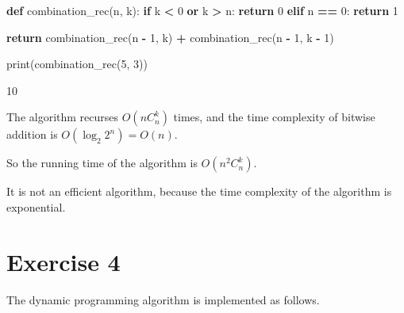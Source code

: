 \documentclass[
]{article}
\newenvironment{Shaded}{\begin{snugshade}}{\end{snugshade}}
\newcommand{\BuiltInTok}[1]{#1}
\newcommand{\ControlFlowTok}[1]{\textcolor[rgb]{0.13,0.29,0.53}{\textbf{#1}}}
\newcommand{\DecValTok}[1]{\textcolor[rgb]{0.00,0.00,0.81}{#1}}
\newcommand{\KeywordTok}[1]{\textcolor[rgb]{0.13,0.29,0.53}{\textbf{#1}}}
\newcommand{\NormalTok}[1]{#1}
\newcommand{\OperatorTok}[1]{\textcolor[rgb]{0.81,0.36,0.00}{\textbf{#1}}}
\begin{document}
\begin{Shaded}
\begin{Highlighting}[]
\KeywordTok{def}\NormalTok{ combination_rec(n, k):}
    \ControlFlowTok{if}\NormalTok{ k }\OperatorTok{<} \DecValTok{0} \KeywordTok{or}\NormalTok{ k }\OperatorTok{>}\NormalTok{ n:}
        \ControlFlowTok{return} \DecValTok{0}
    \ControlFlowTok{elif}\NormalTok{ n }\OperatorTok{==} \DecValTok{0}\NormalTok{:}
        \ControlFlowTok{return} \DecValTok{1}
  
    \ControlFlowTok{return}\NormalTok{ combination_rec(n }\OperatorTok{-} \DecValTok{1}\NormalTok{, k) }\OperatorTok{+}\NormalTok{ combination_rec(n }\OperatorTok{-} \DecValTok{1}\NormalTok{, k }\OperatorTok{-} \DecValTok{1}\NormalTok{)}
  
  
\BuiltInTok{print}\NormalTok{(combination_rec(}\DecValTok{5}\NormalTok{, }\DecValTok{3}\NormalTok{))}
  
\end{Highlighting}
\end{Shaded}

\begin{Shaded}
\begin{Highlighting}[]
\NormalTok{10}
\end{Highlighting}
\end{Shaded}

The algorithm recurses \(O(nC_n^k)\) times, and the time complexity of
bitwise addition is \(O({\log_2 2^n})=O(n)\).

So the running time of the algorithm is \(O(n^2C_n^k)\).

It is not an efficient algorithm, because the time complexity of the
algorithm is exponential.

\hypertarget{exercise-4}{%
\section{Exercise 4}\label{exercise-4}}

The dynamic programming algorithm is implemented as follows.
\end{document}

